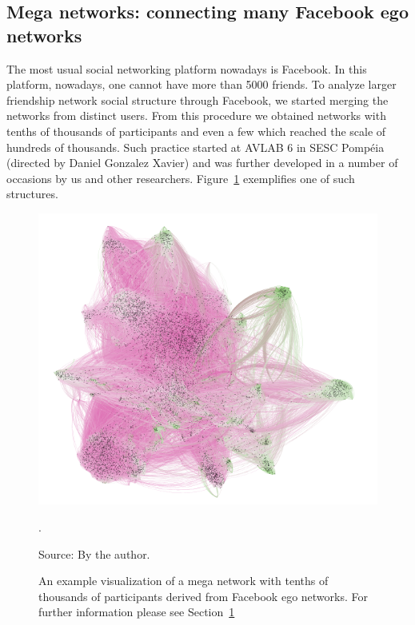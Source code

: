 \begin{apendicesenv}
\section{Mega networks: connecting many Facebook ego networks}\label{sec:megarrede}
The most usual social networking platform nowadays is Facebook.
In this platform, nowadays, one cannot have more than 5000 friends.
To analyze larger friendship network social structure through Facebook,
we started merging the networks from distinct users.
From this procedure we obtained networks with tenths of thousands of participants
and even a few which reached the scale of hundreds of thousands.
Such practice started at AVLAB 6 in SESC Pompéia (directed by Daniel Gonzalez Xavier)
and was further developed in a number of occasions by us and other researchers.
Figure~\ref{fig:megarrede} exemplifies one of such structures.
\begin{figure}[h!]
\begin{center}
\includegraphics[scale=.45]{figs/megarrede}
\caption{An example visualization of a mega network with tenths of thousands of participants derived from Facebook ego networks.
	For further information please see Section~\ref{sec:megarrede}}.
\label{fig:megarrede}
\begin{flushleft}\footnotesize
Source: By the author.\
\end{flushleft}
\end{center}
\end{figure}


\end{apendicesenv}
